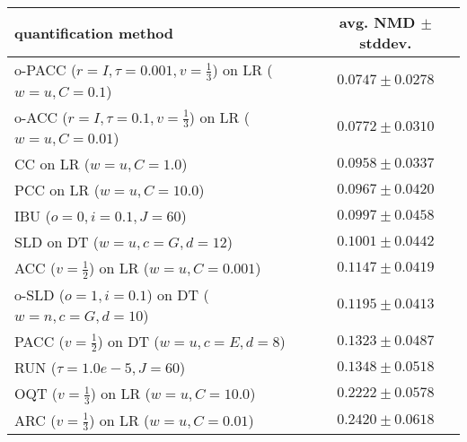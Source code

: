 \begin{tabular}{lc}
  \toprule
  quantification method & avg. NMD $\pm$ stddev. \\
  \midrule
  o-PACC ($r=I, \tau=0.001, v=\frac{1}{3}$) on LR ($w=u, C=0.1$) & $\mathbf{0.0747 \pm 0.0278}$ \\
  o-ACC ($r=I, \tau=0.1, v=\frac{1}{3}$) on LR ($w=u, C=0.01$) & $0.0772 \pm 0.0310$ \\
  CC on LR ($w=u, C=1.0$) & $0.0958 \pm 0.0337$ \\
  PCC on LR ($w=u, C=10.0$) & $0.0967 \pm 0.0420$ \\
  IBU ($o=0, i=0.1, J=60$) & $0.0997 \pm 0.0458$ \\
  SLD on DT ($w=u, c=G, d=12$) & $0.1001 \pm 0.0442$ \\
  ACC ($v=\frac{1}{2}$) on LR ($w=u, C=0.001$) & $0.1147 \pm 0.0419$ \\
  o-SLD ($o=1, i=0.1$) on DT ($w=n, c=G, d=10$) & $0.1195 \pm 0.0413$ \\
  PACC ($v=\frac{1}{2}$) on DT ($w=u, c=E, d=8$) & $0.1323 \pm 0.0487$ \\
  RUN ($\tau=1.0e-5, J=60$) & $0.1348 \pm 0.0518$ \\
  OQT ($v=\frac{1}{3}$) on LR ($w=u, C=10.0$) & $0.2222 \pm 0.0578$ \\
  ARC ($v=\frac{1}{3}$) on LR ($w=u, C=0.01$) & $0.2420 \pm 0.0618$ \\
  \bottomrule
\end{tabular}
